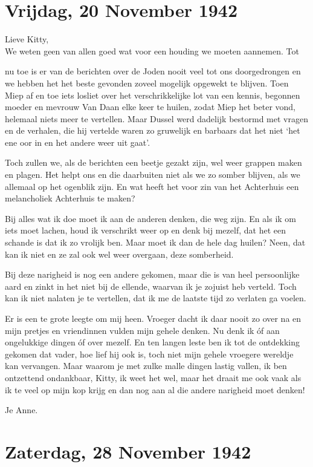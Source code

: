 \documentclass{book}
\begin{document}
\chapter{Vrijdag, 20 November 1942}

Lieve Kitty,\\We weten geen van allen goed wat voor een houding we
moeten aannemen. Tot

nu toe is er van de berichten over de Joden nooit veel tot ons
doorgedrongen en we hebben het het beste gevonden zoveel mogelijk
opgewekt te blijven. Toen Miep af en toe iets losliet over het
verschrikkelijke lot van een kennis, begonnen moeder en mevrouw Van Daan
elke keer te huilen, zodat Miep het beter vond, helemaal niets meer te
vertellen. Maar Dussel werd dadelijk bestormd met vragen en de verhalen,
die hij vertelde waren zo gruwelijk en barbaars dat het niet `het ene
oor in en het andere weer uit gaat'.

Toch zullen we, als de berichten een beetje gezakt zijn, wel weer
grappen maken en plagen. Het helpt ons en die daarbuiten niet als we zo
somber blijven, als we allemaal op het ogenblik zijn. En wat heeft het
voor zin van het Achterhuis een melancholiek Achterhuis te maken?

Bij alles wat ik doe moet ik aan de anderen denken, die weg zijn. En als
ik om iets moet lachen, houd ik verschrikt weer op en denk bij mezelf,
dat het een schande is dat ik zo vrolijk ben. Maar moet ik dan de hele
dag huilen? Neen, dat kan ik niet en ze zal ook wel weer overgaan, deze
somberheid.

Bij deze narigheid is nog een andere gekomen, maar die is van heel
persoonlijke aard en zinkt in het niet bij de ellende, waarvan ik je
zojuist heb verteld. Toch kan ik niet nalaten je te vertellen, dat ik me
de laatste tijd zo verlaten ga voelen.

Er is een te grote leegte om mij heen. Vroeger dacht ik daar nooit zo
over na en mijn pretjes en vriendinnen vulden mijn gehele denken. Nu
denk ik óf aan ongelukkige dingen óf over mezelf. En ten langen leste
ben ik tot de ontdekking gekomen dat vader, hoe lief hij ook is, toch
niet mijn gehele vroegere wereldje kan vervangen. Maar waarom je met
zulke malle dingen lastig vallen, ik ben ontzettend ondankbaar, Kitty,
ik weet het wel, maar het draait me ook vaak als ik te veel op mijn kop
krijg en dan nog aan al die andere narigheid moet denken!

Je Anne.

\chapter{Zaterdag, 28 November 1942}
\end{document}
